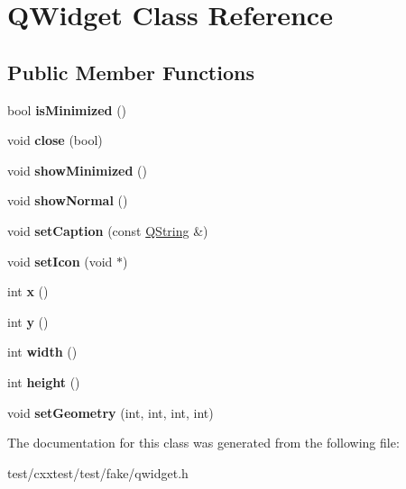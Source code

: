 \hypertarget{classQWidget}{\section{Q\-Widget Class Reference}
\label{classQWidget}
}
\subsection*{Public Member Functions}
\begin{DoxyCompactItemize}
\item 
\hypertarget{classQWidget_afec5e31c0689e979c19999b2c0ed91ac}{bool {\bfseries is\-Minimized} ()}\label{classQWidget_afec5e31c0689e979c19999b2c0ed91ac}

\item 
\hypertarget{classQWidget_a7a9c4c902afb79ab40b0049283004c04}{void {\bfseries close} (bool)}\label{classQWidget_a7a9c4c902afb79ab40b0049283004c04}

\item 
\hypertarget{classQWidget_a43aaef58d04991986640180173237d48}{void {\bfseries show\-Minimized} ()}\label{classQWidget_a43aaef58d04991986640180173237d48}

\item 
\hypertarget{classQWidget_ad7e452d21991ed4ac16f89b48eedf961}{void {\bfseries show\-Normal} ()}\label{classQWidget_ad7e452d21991ed4ac16f89b48eedf961}

\item 
\hypertarget{classQWidget_a8f6d89ee89c845d8e2e7691e529c67e4}{void {\bfseries set\-Caption} (const \hyperlink{classQString}{Q\-String} \&)}\label{classQWidget_a8f6d89ee89c845d8e2e7691e529c67e4}

\item 
\hypertarget{classQWidget_a5d15d6c2a503b53c33bb27040b803e7d}{void {\bfseries set\-Icon} (void $\ast$)}\label{classQWidget_a5d15d6c2a503b53c33bb27040b803e7d}

\item 
\hypertarget{classQWidget_a767bedb0b0888ba64e649c91dc0bdea4}{int {\bfseries x} ()}\label{classQWidget_a767bedb0b0888ba64e649c91dc0bdea4}

\item 
\hypertarget{classQWidget_a673dbd643c3ac599e7db2574f94fbcc9}{int {\bfseries y} ()}\label{classQWidget_a673dbd643c3ac599e7db2574f94fbcc9}

\item 
\hypertarget{classQWidget_acd6fc1a1f6f49aa3c1bb9f3651cb8002}{int {\bfseries width} ()}\label{classQWidget_acd6fc1a1f6f49aa3c1bb9f3651cb8002}

\item 
\hypertarget{classQWidget_ae0776fd05c30fbac20c89e8131d0f798}{int {\bfseries height} ()}\label{classQWidget_ae0776fd05c30fbac20c89e8131d0f798}

\item 
\hypertarget{classQWidget_acb4330d9d71526557fee6d08fa5b58fc}{void {\bfseries set\-Geometry} (int, int, int, int)}\label{classQWidget_acb4330d9d71526557fee6d08fa5b58fc}

\end{DoxyCompactItemize}


The documentation for this class was generated from the following file\-:\begin{DoxyCompactItemize}
\item 
test/cxxtest/test/fake/qwidget.\-h\end{DoxyCompactItemize}
